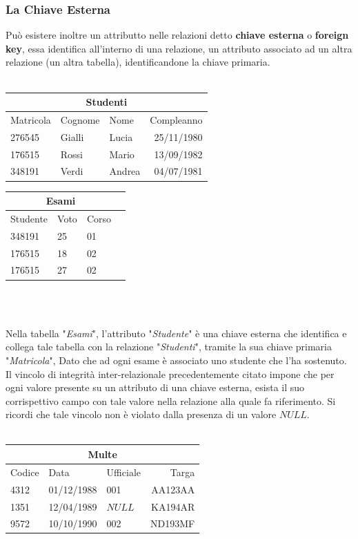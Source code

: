 \documentclass[12pt, letterpaper]{article}
\begin{document}
\subsubsection{La Chiave Esterna}
Può esistere inoltre un attributto nelle relazioni detto \textbf{chiave esterna} o \textbf{foreign key},
essa identifica all'interno di una relazione, un attributo associato ad un altra relazione (un altra tabella),
identificandone la chiave primaria.
\\ \hphantom{.}\\
\centering
\begin{tabular}{|l|l|l|r|}
    \hline
\multicolumn{4}{|c|}{\textbf{Studenti}}\\
    \hline
    \color{blue}Matricola & Cognome & Nome & Compleanno\\
    \hline
    276545 & Gialli & Lucia & 25/11/1980\\
    \hline
    176515 & Rossi & Mario & 13/09/1982\\
    \hline
    348191 & Verdi & Andrea & 04/07/1981\\
    \hline
    \end{tabular}
\begin{tabular}{|l|l|l|r|}
    \hline
\multicolumn{3}{|c|}{\textbf{Esami}}\\
    \hline
    \color{blue}Studente & Voto & Corso \\
    \hline
    348191 & 25 & 01 \\
    \hline
    176515 & 18 & 02 \\
    \hline
    176515 & 27 & 02 \\
    \hline
    \end{tabular}
\\ 
 \hphantom{.}\\
 \raggedright
Nella tabella "\textit{Esami}", l'attributo "\textit{Studente}" è una chiave esterna che identifica e collega 
tale tabella con la relazione "\textit{Studenti}", tramite la sua chiave primaria "\textit{Matricola}",
Dato che ad ogni esame è associato uno studente che l'ha sostenuto. Il vincolo di integrità inter-relazionale
precedentemente citato impone che per ogni valore presente su un attributo di una chiave esterna, esista 
il suo corrispettivo campo con tale valore nella relazione alla quale fa riferimento. Si ricordi che tale vincolo
non è violato dalla presenza di un valore \(NULL\). 
\\ \hphantom{.}\\
\centering
\begin{tabular}{|l|l|l|r|}
    \hline
\multicolumn{4}{|c|}{\textbf{Multe}}\\
    \hline
    Codice & Data & Ufficiale & Targa\\
    \hline
    4312 & 01/12/1988 & 001 & AA123AA\\
    \hline
    1351 & 12/04/1989 & \color{blue}\(NULL\) & KA194AR\\
    \hline
    9572 & 10/10/1990 & 002 & ND193MF\\
    \hline
    \end{tabular}
\end{document}
